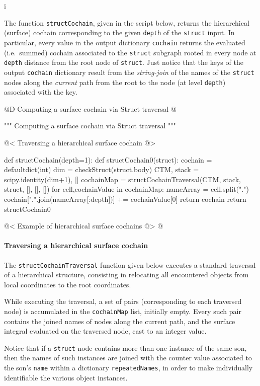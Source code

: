i\documentclass[11pt,oneside]{article}    %
\begin{document}
The function \texttt{structCochain}, given in the script below, returns the hierarchical (surface) cochain corresponding to the given \texttt{depth} of the \texttt{struct} input. In particular, every value in the output dictionary \texttt{cochain} returns the evaluated (i.e.~summed) cochain associated to the \texttt{struct} subgraph rooted in every node at  \texttt{depth} distance from the root node of \texttt{struct}. Just notice that the keys of the output \texttt{cochain} dictionary result from the \emph{string-join} of the names of the \texttt{struct} nodes along the \emph{current} path from the root to the node (at level \texttt{depth}) associated with the key.

@D Computing a surface cochain via Struct traversal
@{""" Computing a surface cochain via Struct traversal """

@< Traversing a hierarchical surface cochain @>

def structCochain(depth=1):
    def structCochain0(struct):
        cochain = defaultdict(int)
        dim = checkStruct(struct.body)
        CTM, stack = scipy.identity(dim+1), []
        cochainMap = structCochainTraversal(CTM, stack, struct, [], [], []) 
        for cell,cochainValue in cochainMap:
            nameArray = cell.split(".")
            cochain[".".join(nameArray[:depth])] += cochainValue[0]
        return cochain
    return structCochain0
    
@< Example of hierarchical surface cochains @>
@}

\paragraph{Traversing a hierarchical surface cochain}
The \texttt{structCochainTraversal} function given below executes a standard traversal of a hierarchical structure, consisting in relocating all encountered objects from local coordinates to the root coordinates. 

While executing the traversal, a set of pairs (corresponding to each traversed node) is accumulated in the \texttt{cochainMap} list, initially empty. Every such pair contains the joined names of nodes along the current path, and the surface integral evaluated on the traversed node, cast to an integer value. 

Notice that if a \texttt{struct} node contains more than one instance of the same son, then the names of such instances are joined with the counter value associated to the son's \texttt{name} within a dictionary \texttt{repeatedNames}, in order to make individually identifiable the various object instances.
\end{document}
